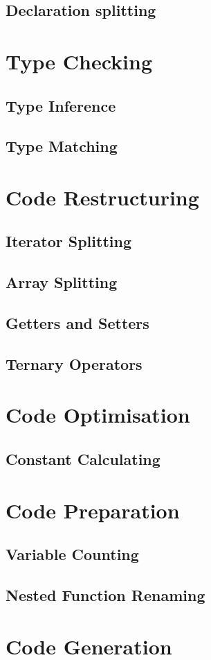 \documentclass[a4paper,11pt]{report}
\begin{document}
\subsection{Declaration splitting}

\section{Type Checking}
\subsection{Type Inference}
\subsection{Type Matching}

\section{Code Restructuring}
\subsection{Iterator Splitting}
\subsection{Array Splitting}
\subsection{Getters and Setters}
\subsection{Ternary Operators}

\section{Code Optimisation}
\subsection{Constant Calculating}

\section{Code Preparation}
\subsection{Variable Counting}
\subsection{Nested Function Renaming}

\section{Code Generation}
\end{document}
